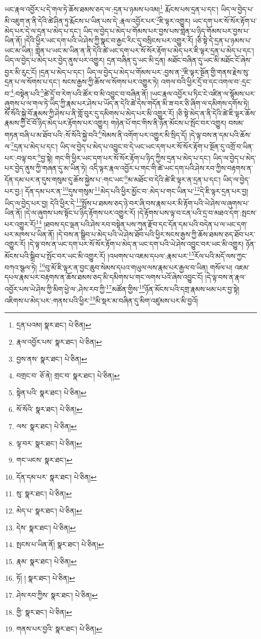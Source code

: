 ཡང་རྣལ་འབྱོར་པ་དེ་གལ་ཏེ་ཆོས་ཐམས་ཅད་ལ་:དྲན་པ་ཉམས་པའམ།\footnote{དྲན་པའམ།  སྣར་ཐང་།  པེ་ཅིན། } རྨོངས་པས་དྲན་པ་དང་། ཡིད་ལ་བྱེད་པ་མི་འཇུག་ན་ནི་དེའི་ཚེ་ཤིན་ཏུ་རྨོངས་པ་ཡིན་པས་དེ་:རྣལ་འབྱོར་པར་\footnote{རྣལ་འབྱོར་པས་  སྣར་ཐང་།  པེ་ཅིན། }ཇི་ལྟར་འགྱུར། ཡང་དག་པར་སོ་སོར་རྟོག་པ་མེད་པར་དེ་ལ་དྲན་པ་མེད་པ་དང་། ཡིད་ལ་བྱེད་པ་མེད་པ་གོམས་པར་བྱས་པས་གླེན་པ་ཉིད་གོམས་པར་བྱས་པ་ཡིན་ནོ། །དེའི་ཕྱིར་ཡང་དག་པའི་ཡེ་ཤེས་ཀྱི་སྣང་བ་རྒྱང་རིང་དུ་བསྲིངས་པར་འགྱུར་རོ། །ཅི་སྟེ་དེ་དྲན་པ་ཉམས་པ་ཡང་མ་ཡིན། གླེན་པ་ཡང་མ་ཡིན་ན་ནི་དེའི་ཚེ་ཡང་དག་པར་སོ་སོར་རྟོག་པ་མེད་པར་ཇི་ལྟར་དྲན་པ་མེད་པ་དང་། ཡིད་ལ་བྱེད་པ་མེད་པར་བྱེད་ནུས་པར་འགྱུར། དྲན་བཞིན་དུ་ཡང་མི་དྲན། མཐོང་བཞིན་དུ་ཡང་མི་མཐོང་ངོ་ཞེས་བྱར་མི་རུང་ངོ། །དྲན་པ་མེད་པ་དང་། ཡིད་ལ་བྱེད་པ་མེད་པ་གོམས་པར་:བྱས་ན་\footnote{བྱས་ནས་  སྣར་ཐང་།  པེ་ཅིན། }ཇི་ལྟར་སྔོན་གྱི་གནས་རྗེས་སུ་དྲན་པ་ལ་སོགས་པ་དང་། སངས་རྒྱས་ཀྱི་ཆོས་ལ་སོགས་པར་འགྱུར་ཏེ། འགལ་བའི་ཕྱིར་དྲོ་བ་དང་འགལ་བ་:དྲང་བ་\footnote{བགྲང་བ་  ཅོ་ནེ། གྲང་བ་  སྣར་ཐང་།  པེ་ཅིན། }:བསྟེན་པའི་\footnote{སྟེན་པའི་  སྣར་ཐང་།  པེ་ཅིན། }ཚེ་དྲོ་བ་རེག་པའི་ཚོར་བ་མི་འབྱུང་བ་བཞིན་ནོ། །ཡང་རྣལ་འབྱོར་པ་ཏིང་ངེ་འཛིན་ལ་སྙོམས་པར་ཞུགས་པ་ལ་གལ་ཏེ་ཡིད་ཀྱི་རྣམ་པར་ཤེས་པ་ཡོད་ན་དེའི་ཚེ་དེས་གདོན་མི་ཟ་བར་ཅི་ཞིག་ལ་དམིགས་དགོས་ཏེ། སོ་སོའི་སྐྱེ་བོ་རྣམས་ཀྱི་ཤེས་པ་ནི་གློ་བུར་དུ་དམིགས་པ་མེད་པར་མི་འགྱུར་རོ། །ཅི་སྟེ་མེད་ན་ནི་དེའི་ཚེ་ཇི་ལྟར་ཆོས་རྣམས་ཀྱི་ངོ་བོ་ཉིད་མེད་པར་རྟོགས་པར་འགྱུར། གཉེན་པོ་གང་གིས་ནི་ཉོན་མོངས་པ་སྤོང་བར་འགྱུར། བསམ་གཏན་བཞི་པ་མ་ཐོབ་པའི་:སོ་སོའི་སྐྱེ་བའི་\footnote{སོ་སོའི་  སྣར་ཐང་།  པེ་ཅིན། }སེམས་ནི་འགོག་པར་འགྱུར་མི་སྲིད་དོ། །དེ་ལྟ་བས་ན་དམ་པའི་ཆོས་ལ་\footnote{ལས་  སྣར་ཐང་།  པེ་ཅིན། }དྲན་པ་མེད་པ་དང་། ཡིད་ལ་བྱེད་པ་མེད་པ་འབྱུང་བ་དེ་ཡང་ཡང་དག་པར་སོ་སོར་རྟོག་པ་སྔོན་དུ་འགྲོ་བ་ཡིན་པར་:བལྟ་བར་\footnote{ལྟ་བར་  སྣར་ཐང་།  པེ་ཅིན། }བྱ་སྟེ། གང་གི་ཕྱིར་ཡང་དག་པར་སོ་སོར་རྟོག་པ་ཉིད་ཀྱིས་དྲན་པ་མེད་པ་དང་། ཡིད་ལ་བྱེད་པ་མེད་པར་བྱེད་ནུས་ཀྱི་གཞན་དུ་མ་ཡིན་ཏེ། འདི་ལྟར་རྣལ་འབྱོར་པ་གང་གི་ཚེ་ཡང་དག་པའི་ཤེས་རབ་ཀྱིས་བརྟགས་ན་དོན་དམ་པར་ན་དུས་གསུམ་དུ་ཆོས་སྐྱེས་པ་:གང་ཡང་\footnote{གང་ཡངས་  སྣར་ཐང་། }མ་མཐོང་བ་དེའི་ཚེ་ཇི་ལྟར་ན་དྲན་པ་དང་། ཡིད་ལ་བྱེད་པར་བྱ:། དོན་དམ་པར་ན་\footnote{དོན་དམ་པར་  སྣར་ཐང་།  པེ་ཅིན། }དུས་གསུམ་\footnote{སུ་  སྣར་ཐང་།  པེ་ཅིན། }མེད་པའི་ཕྱིར་མྱོང་བ་:མེད་པ་གང་ཡིན་པ་\footnote{མེད་པ་  སྣར་ཐང་།  པེ་ཅིན། }དེ་ཇི་ལྟར་དྲན་པར་བྱ། ཡིད་ལ་བྱེད་པར་བྱ། དེའི་ཕྱིར་དེ་\footnote{དེས་  སྣར་ཐང་།  པེ་ཅིན། }སྤྲོས་པ་ཐམས་ཅད་ཉེ་བར་ཞི་བས་རྣམ་པར་མི་རྟོག་པའི་ཡེ་ཤེས་ལ་ཞུགས་པ་ཡིན་ནོ། །དེ་ལ་ཞུགས་པས་སྟོང་པ་ཉིད་རྟོགས་པར་འགྱུར་རོ། །དེ་རྟོགས་པས་ལྟ་བ་ངན་པའི་དྲ་བ་མཐའ་དག་:སྤངས་པར་འགྱུར་རོ།\footnote{སྤངས་པ་ཡིན་ནོ།  སྣར་ཐང་།  པེ་ཅིན། } །ཐབས་དང་ལྡན་པའི་ཤེས་རབ་བསྟེན་པས་ཀུན་རྫོབ་དང་དོན་དམ་པའི་བདེན་པ་ལ་ཡང་དག་པར་མཁས་པ་ཡིན་ནོ། །དེ་བས་ན་སྒྲིབ་པ་མེད་པའི་ཡེ་ཤེས་ཐོབ་པའི་ཕྱིར་སངས་རྒྱས་ཀྱི་ཆོས་ཐམས་ཅད་ཐོབ་པར་འགྱུར་རོ། །དེ་ལྟ་བས་ན་ཡང་དག་པར་སོ་སོར་རྟོག་པ་མེད་ན་ཡང་དག་པའི་ཡེ་ཤེས་འབྱུང་བར་ཡང་མི་འགྱུར། ཉོན་མོངས་པའི་སྒྲིབ་པ་སྤོང་བར་ཡང་མི་འགྱུར་རོ། །འཕགས་པ་འཇམ་དཔལ་:རྣམ་པར་\footnote{རྣམ་  སྣར་ཐང་།  པེ་ཅིན། }རོལ་པའི་མདོ་ལས་ཀྱང་བཀའ་སྩལ་ཏེ། \footnote{ཏོ། །   སྣར་ཐང་།  པེ་ཅིན། }བུ་མོ་ཇི་ལྟར་ན་བྱང་ཆུབ་སེམས་དཔའ་གཡུལ་ལས་རྣམ་པར་རྒྱལ་བ་ཡིན། གསོལ་པ། འཇམ་དཔལ་རྣམ་པར་བརྟགས་ན་ཆོས་ཐམས་ཅད་མི་དམིགས་པ་གང་ལགས་པའོ་ཞེས་འབྱུང་ངོ། །དེ་ལྟ་བས་ན་རྣལ་འབྱོར་པས་ཡེ་ཤེས་ཀྱི་མིག་ཕྱེ་ལ་:ཤེས་རབ་ཀྱི་\footnote{ཤེས་རབ་ཀྱིས་  སྣར་ཐང་།  པེ་ཅིན། }མཚོན་གྱིས་\footnote{གྱི་  སྣར་ཐང་།  པེ་ཅིན། }ཉོན་མོངས་པའི་དགྲ་རྣམས་ཕམ་པར་བྱ་སྟེ། འཇིགས་པ་མེད་པར་:གནས་པའི་ཕྱིར་\footnote{གནས་པར་བྱའི་  སྣར་ཐང་།  པེ་ཅིན། }མི་སྡར་མ་བཞིན་དུ་མིག་འཛུམས་པར་མི་བྱའོ། 